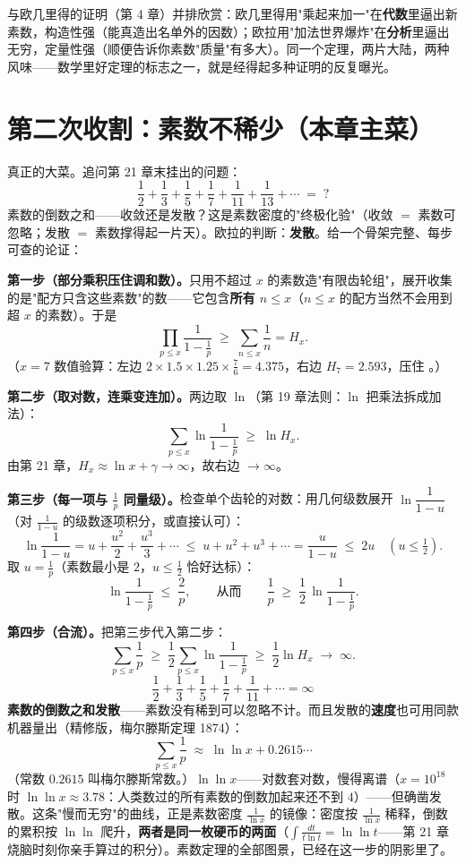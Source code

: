 与欧几里得的证明（第 4 章）并排欣赏：欧几里得用"乘起来加一"在\textbf{代数}里逼出新素数，构造性强（能真造出名单外的因数）；欧拉用"加法世界爆炸"在\textbf{分析}里逼出无穷，定量性强（顺便告诉你素数"质量"有多大）。同一个定理，两片大陆，两种风味——数学里好定理的标志之一，就是经得起多种证明的反复曝光。

\section{第二次收割：素数不稀少（本章主菜）}

真正的大菜。追问第 21 章末挂出的问题：
\[
\frac12 + \frac13 + \frac15 + \frac17 + \frac1{11} + \frac1{13} + \cdots \;=\; ?
\]
素数的倒数之和——收敛还是发散？这是素数密度的"终极化验"（收敛 $=$ 素数可忽略；发散 $=$ 素数撑得起一片天）。欧拉的判断：\textbf{发散}。给一个骨架完整、每步可查的论证：

\textbf{第一步（部分乘积压住调和数）。}只用不超过 $x$ 的素数造"有限齿轮组"，展开收集的是"配方只含这些素数"的数——它包含\textbf{所有 $n \le x$}（$n\le x$ 的配方当然不会用到超 $x$ 的素数）。于是
\[
\prod_{p \le x}\frac{1}{1-\frac1p} \;\ge\; \sum_{n\le x}\frac1n = H_x .
\]
（$x = 7$ 数值验算：左边 $2\times1.5\times1.25\times\tfrac76 = 4.375$，右边 $H_7 = 2.593$，压住 \checkmark。）

\textbf{第二步（取对数，连乘变连加）。}两边取 $\ln$（第 19 章法则：$\ln$ 把乘法拆成加法）：
\[
\sum_{p\le x}\ln\frac{1}{1-\frac1p} \;\ge\; \ln H_x .
\]
由第 21 章，$H_x \approx \ln x + \gamma \to \infty$，故右边 $\to\infty$。

\textbf{第三步（每一项与 $\tfrac1p$ 同量级）。}检查单个齿轮的对数：用几何级数展开 $\ln\dfrac1{1-u}$（对 $\tfrac1{1-u}$ 的级数逐项积分，或直接认可）：
\[
\ln\frac{1}{1-u} = u + \frac{u^2}{2} + \frac{u^3}{3} + \cdots \;\le\; u + u^2 + u^3 + \cdots = \frac{u}{1-u} \;\le\; 2u \quad (u \le \tfrac12).
\]
取 $u = \tfrac1p$（素数最小是 $2$，$u \le \tfrac12$ 恰好达标）：
\[
\ln\frac{1}{1-\frac1p} \;\le\; \frac{2}{p},
\qquad\text{从而}\qquad
\frac1p \;\ge\; \frac12\,\ln\frac{1}{1-\frac1p}.
\]

\textbf{第四步（合流）。}把第三步代入第二步：
\[
\sum_{p\le x}\frac1p \;\ge\; \frac12\sum_{p\le x}\ln\frac{1}{1-\frac1p} \;\ge\; \frac12 \ln H_x \;\longrightarrow\; \infty .
\]
\[
\boxed{\;\frac12 + \frac13 + \frac15 + \frac17 + \frac1{11} + \cdots = \infty\;}
\]
\textbf{素数的倒数之和发散}——素数没有稀到可以忽略不计。而且发散的\textbf{速度}也可用同款机器量出（精修版，梅尔滕斯定理 1874）：
\[
\sum_{p\le x}\frac1p \;\approx\; \ln\ln x + 0.2615\cdots
\]
（常数 $0.2615$ 叫梅尔滕斯常数。）$\ln\ln x$——对数套对数，慢得离谱（$x = 10^{18}$ 时 $\ln\ln x \approx 3.78$：人类数过的所有素数的倒数加起来还不到 $4$）——但确凿发散。这条"慢而无穷"的曲线，正是素数密度 $\tfrac1{\ln x}$ 的镜像：密度按 $\tfrac1{\ln x}$ 稀释，倒数的累积按 $\ln\ln$ 爬升，\textbf{两者是同一枚硬币的两面}（$\int\tfrac{dt}{t\ln t} = \ln\ln t$——第 21 章烧脑时刻你亲手算过的积分）。素数定理的全部图景，已经在这一步的阴影里了。

